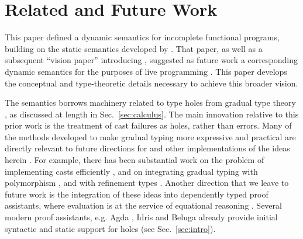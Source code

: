 \vspace{-5px}
\newcommand{\relatedWorkSection}{Related and Future Work}
\section{\protect\relatedWorkSection} %
\label{sec:relatedWork}
\vspace{-2px}

This paper defined a dynamic semantics for incomplete functional programs,
building on the static semantics developed by \citet{popl-paper}. That paper, as well as a subsequent ``vision paper'' introducing \Hazel, suggested as future work  
a corresponding dynamic semantics for the purposes of live programming \cite{HazelnutSNAPL}. 
This paper    
develops the conceptual and type-theoretic details necessary to achieve this broader vision.


The semantics borrows machinery related to type holes from gradual type theory \cite{Siek06a,DBLP:conf/snapl/SiekVCB15}, as discussed
at length in Sec.~\ref{sec:calculus}. The main innovation relative to this
prior work is the treatment of cast failures as holes, rather than errors.
Many of the methods developed to make gradual typing more expressive and practical are directly relevant to future directions for \Hazel and other implementations of the ideas herein \cite{takikawa_et_al:LIPIcs:2015:5215}. For example, there has been substantial work on the problem of implementing casts efficiently \cite{herman2010space,siek2010threesomes,garcia2013threesomes}, and on integrating gradual typing with polymorphism \cite{DBLP:conf/esop/XieBO18,Igarashi:2017:PGT:3136534.3110284}, and with refinement types \cite{DBLP:conf/popl/LehmannT17}. Another direction that we leave to future work is the integration of these ideas into dependently typed proof assistants, 
where evaluation is at the service of equational reasoning \cite{DBLP:journals/corr/abs-1009-2789}. Several modern proof assistants, e.g. Agda \cite{norell2009dependently,norell:thesis}, Idris \cite{brady2013idris} and Beluga \cite{DBLP:conf/flops/Pientka10} already provide initial syntactic and static support for holes (see Sec.~\ref{sec:intro}).

